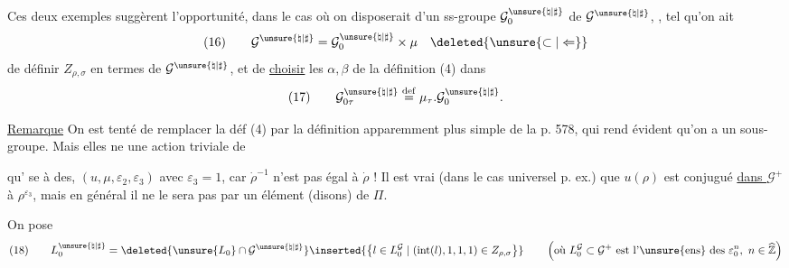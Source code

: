 Ces deux  exemples suggèrent l'opportunité,
dans le cas  où on disposerait d'un ss-groupe
 $\mathcal{G}^{\unsure{\natural|\sharp}}_0$
de $\mathcal{G}^{\unsure{\natural|\sharp}}$,
, tel qu'on ait
\[
(16)\qquad
\mathcal{G}^{\unsure{\natural|\sharp}}
=\mathcal{G}^{\unsure{\natural|\sharp}}_0\times\mu
\quad\deleted{\unsure{\subset|\Leftarrow}}
\]
de définir $Z_{\rho,\sigma}$ en termes de
$\mathcal{G}^{\unsure{\natural|\sharp}}$, et de
\uline{choisir} les $\alpha,\beta$ de la définition (4) dans
\[
(17)\qquad
\mathcal{G}^{\unsure{\natural|\sharp}}_{0\tau}
\overset{\mathrm{def}}{=}
\mu_\tau.\mathcal{G}^{\unsure{\natural|\sharp}}_0.
\]

\uline{Remarque} On est tenté de remplacer la déf (4)
par la définition apparemment plus simple de la p. 578,
qui rend évident qu'on a un sous-groupe.
Mais elles ne 
une action triviale de



qu' se  à des, $(u,\mu,\varepsilon_2,\varepsilon_3)$ avec $\varepsilon_3=1$,
car $\dot{\rho}^{-1}$ n'est pas égal à $\dot{\rho}$ ! Il est vrai 
(dans le cas universel p. ex.) que $u(\rho)$ est conjugué \uline{dans $\mathcal{G}^{+}$}
à $\rho^{\varepsilon_3}$, mais en général il ne le sera pas par un élément (disons) de $\Pi$.

On pose
\[
(18)\qquad
L_0^{\unsure{\natural|\sharp}}
=\deleted{\unsure{L_0}\cap\mathcal{G}^{\unsure{\natural|\sharp}}}
\inserted{\bigl\{l\in L_0^{\mathcal{G}}\mid
(\operatorname{int}(l),1,1,1)\in Z_{\rho,\sigma}\bigr\}}
\qquad
\left(\text{où }L_0^{\mathcal{G}}\subset\mathcal{G}^{+}
\text{ est l'\unsure{ens} des }\varepsilon_0^n,\ n\in\widehat{\mathbb{Z}}\right)
\]

